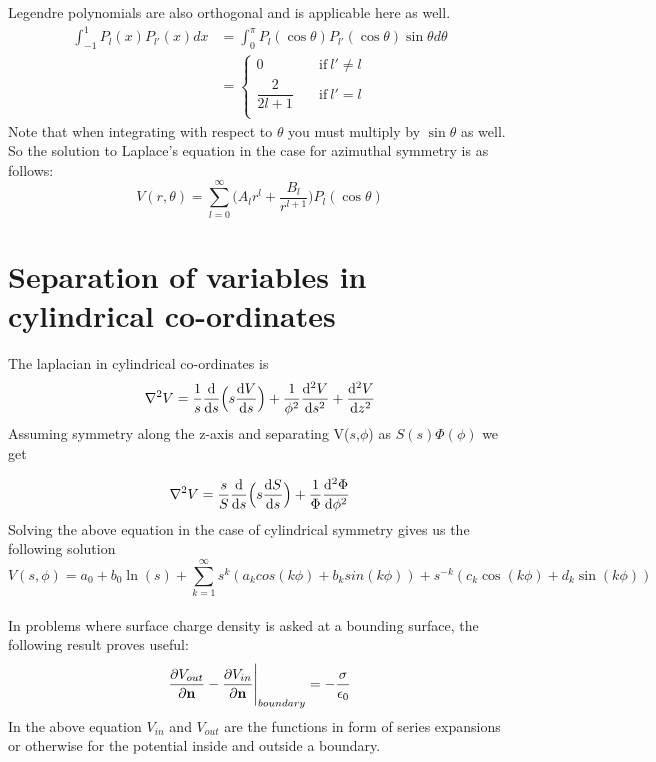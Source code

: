 \documentclass[12pt, oneside]{book}
\begin{document}
Legendre polynomials are also orthogonal and  is applicable here as well. 
\begin{align}
	\int_{-1}^{1}P_l(x)P_{l'}(x)dx&=\int_{0}^{\pi}P_l(\cos\theta)P_{l'}(\cos\theta)\sin{\theta} d\theta \\
	                              &=\begin{cases}
	                              	0  \quad &\text{if} \ l'\neq l\\
	                              	\dfrac{2}{2l+1} \quad &\text{if} \ l'=l \\
	                              \end{cases} 
\end{align}
Note that when integrating with respect to $\theta$ you must multiply by $\sin\theta$ as well. So the solution to Laplace's equation in the case for azimuthal symmetry is as follows:
\begin{equation}
	V(r,\theta)=\sum_{l=0}^{\infty}\Big(A_lr^l+\dfrac{B_l}{r^{l+1}}\Big)P_l(\cos\theta)
\end{equation}

\section{Separation of variables in cylindrical co-ordinates}
The laplacian in cylindrical co-ordinates is
\begin{equation}
	\laplacian{V}=\frac{1}{s}\dv{s}\Big(s\dv{V}{s}\Big)+\frac{1}{\phi^2}\dv[2]{V}{s}+\dv[2]{V}{z}
\end{equation}
Assuming symmetry along the z-axis and separating V($s$,$\phi$) as $S(s)\Phi(\phi)$ we get

\begin{equation}
	\laplacian{V}=\frac{s}{S}\dv{s}\Big(s\dv{S}{s}\Big)+\frac{1}{\Phi}\dv[2]{\Phi}{\phi}
\end{equation}
Solving the above equation in the case of cylindrical symmetry gives us the following solution
\begin{equation}
    V(s,\phi)=a_0+b_0\ln(s)+\sum_{k=1}^{\infty}s^k(a_kcos(k\phi)+b_ksin(k\phi))+s^{-k}(c_k\cos(k\phi)+d_k\sin(k\phi))
\end{equation}\\


In problems where surface charge density is asked at a bounding surface, the following result proves useful:
\begin{equation}
	 \pdv{V_{out}}{\textbf{n}}-\pdv{V_{in}}{\textbf{n}}\Bigg|_{boundary}=-\dfrac{\sigma}{\epsilon_0}
\end{equation}
In the above equation $V_{in}$ and $V_{out}$ are the functions in form of series expansions or otherwise for the potential inside and outside a boundary.
\end{document}
